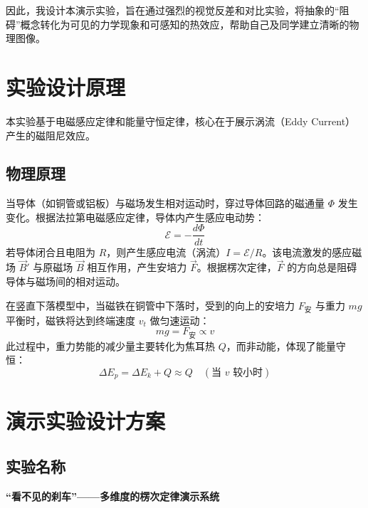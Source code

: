 \documentclass[a4paper,12pt]{article}
\begin{document}
因此，我设计本演示实验，旨在通过强烈的视觉反差和对比实验，将抽象的“阻碍”概念转化为可见的力学现象和可感知的热效应，帮助自己及同学建立清晰的物理图像。

\section{实验设计原理}

本实验基于电磁感应定律和能量守恒定律，核心在于展示涡流（Eddy Current）产生的磁阻尼效应。

\subsection{物理原理}
当导体（如铜管或铝板）与磁场发生相对运动时，穿过导体回路的磁通量 $\Phi$ 发生变化。根据法拉第电磁感应定律，导体内产生感应电动势：
\begin{equation}
    \mathcal{E} = -\frac{d\Phi}{dt}
\end{equation}
若导体闭合且电阻为 $R$，则产生感应电流（涡流）$I = \mathcal{E}/R$。该电流激发的感应磁场 $\vec{B}'$ 与原磁场 $\vec{B}$ 相互作用，产生安培力 $\vec{F}$。根据楞次定律，$\vec{F}$ 的方向总是阻碍导体与磁场间的相对运动。

在竖直下落模型中，当磁铁在铜管中下落时，受到的向上的安培力 $F_{\text{安}}$ 与重力 $mg$ 平衡时，磁铁将达到终端速度 $v_t$ 做匀速运动：
\begin{equation}
    mg = F_{\text{安}} \propto v
\end{equation}
此过程中，重力势能的减少量主要转化为焦耳热 $Q$，而非动能，体现了能量守恒：
\begin{equation}
    \Delta E_p = \Delta E_k + Q \approx Q \quad (\text{当 } v \text{ 较小时})
\end{equation}

\section{演示实验设计方案}

\subsection{实验名称}
\textbf{“看不见的刹车”——多维度的楞次定律演示系统}
\end{document}
